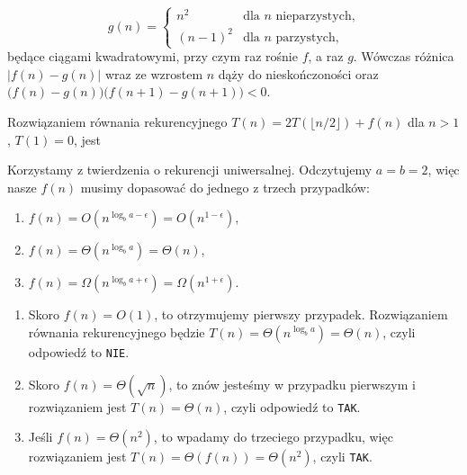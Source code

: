 \begin{solutions}
\begin{enumerate}[\bf A.]
        $$
        g(n) = 
        \begin{cases}
            n^2 & \text{dla } n \text{ nieparzystych,} \\
            (n - 1)^2 & \text{dla } n \text{ parzystych,}
        \end{cases}
        $$
        będące ciągami kwadratowymi, przy czym raz rośnie $f$, a raz $g$. Wówczas różnica $|f(n)-g(n)|$ wraz ze wzrostem $n$ dąży do nieskończoności oraz $\big(f(n)-g(n)\big)\big(f(n+1)-g(n+1)\big) < 0$.
    \end{enumerate}

    \sol Rozwiązaniem równania rekurencyjnego $T(n)=2T(\lfloor n/2 \rfloor)+f(n)$ dla $n>1$, $T(1)=0$, jest
    
    Korzystamy z twierdzenia o rekurencji uniwersalnej. Odczytujemy $a=b=2$, więc nasze $f(n)$ musimy dopasować do jednego z trzech przypadków:
    \begin{enumerate}[1.]
        \item $f(n)=O(n^{\log_b{a}-\epsilon})=O(n^{1-\epsilon})$,
        \item $f(n)=\Theta(n^{\log_b{a}})=\Theta(n)$,
        \item $f(n)=\Omega(n^{\log_b{a}+\epsilon})=\Omega(n^{1+\epsilon})$.
    \end{enumerate}

    \begin{enumerate}[\bf A.]
        \item Skoro $f(n)=O(1)$, to otrzymujemy pierwszy przypadek. Rozwiązaniem równania rekurencyjnego będzie $T(n)=\Theta(n^{\log_ba})=\Theta(n)$, czyli odpowiedź to \texttt{NIE}.

        \item Skoro $f(n)=\Theta(\sqrt{n})$, to znów jesteśmy w przypadku pierwszym i rozwiązaniem jest $T(n)=\Theta(n)$, czyli odpowiedź to \texttt{TAK}.

        \item Jeśli $f(n)=\Theta(n^2)$, to wpadamy do trzeciego przypadku, więc rozwiązaniem jest $T(n)=\Theta(f(n))=\Theta(n^2)$, czyli \texttt{TAK}.
    \end{enumerate}
\end{solutions}
